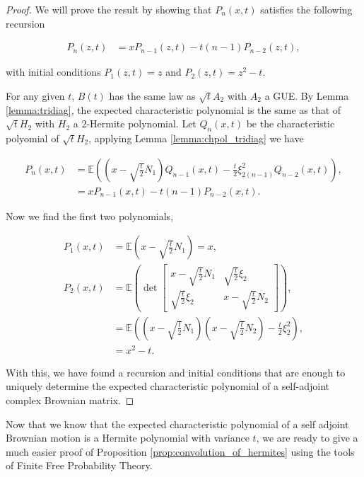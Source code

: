 \begin{proof}

    We will prove the result by showing that $P_n(x,t)$ satisfies the following recursion
    
    \begin{align*}
        P_n(z,t) &= x P_{n-1}(z,t) - t(n-1)P_{n-2}(z,t),
    \end{align*}

    \noindent with initial conditions $P_1(z,t) = z$ and $P_2(z,t) = z^2-t$.

    For any given $t$, $B(t)$ has the same law as $\sqrt{t}A_2$ with $A_2$ a GUE. By Lemma \ref{lemma:tridiag}, the expected characteristic polynomial is the same as that of $\sqrt{t}H_2$ with $H_2$ a $2$-Hermite polynomial. Let $Q_n(x,t)$ be the characteristic polyomial of $\sqrt{t}H_2$, applying Lemma \ref{lemma:chpol_tridiag} we have

    \begin{align*}
        P_n(x,t) &= \mathbb E \left(  \left( x - \sqrt{\frac t2}N_1 \right) Q_{n-1}(x,t) - \frac t2 \xi_{2(n-1)}^2 Q_{n-2}(x,t)\right), \\ 
        &= x P_{n-1}(x,t) - t(n-1)P_{n-2}(x,t).
    \end{align*}

    Now we find the first two polynomials,

    \begin{align*}
        P_1(x,t) &= \mathbb E \left( x - \sqrt{\frac t2}N_1 \right) = x,\\
        P_2(x,t) &= \mathbb E \left( \det\begin{bmatrix}
            x - \sqrt{\frac t2}N_1 & \sqrt{\frac t2} \xi_2 \\ 
            \sqrt{\frac t2} \xi_2  & x - \sqrt{\frac t2}N_2                         
        \end{bmatrix} \right),\\ 
        &= \mathbb E \left( \left(x - \sqrt{\frac t2}N_1\right)\left( x - \sqrt{\frac t2}N_2 \right) - \frac t2 \xi_2^2 \right),\\ 
        &= x^2 - t.
    \end{align*}

    With this, we have found a recursion and initial conditions that are enough to uniquely determine the expected characteristic polynomial of a self-adjoint complex Brownian matrix.
\end{proof}

    Now that we know that the expected characteristic polynomial of a self adjoint Brownian motion is a Hermite polynomial with variance $t$, we are ready to give a much easier proof of Proposition \ref{prop:convolution_of_hermites} using the tools of Finite Free Probability Theory.

